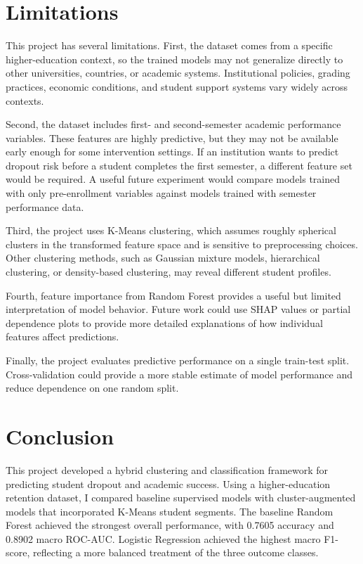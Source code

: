 \documentclass{article}
\begin{document}
\section{Limitations}

This project has several limitations. First, the dataset comes from a specific higher-education context, so the trained models may not generalize directly to other universities, countries, or academic systems. Institutional policies, grading practices, economic conditions, and student support systems vary widely across contexts.

Second, the dataset includes first- and second-semester academic performance variables. These features are highly predictive, but they may not be available early enough for some intervention settings. If an institution wants to predict dropout risk before a student completes the first semester, a different feature set would be required. A useful future experiment would compare models trained with only pre-enrollment variables against models trained with semester performance data.

Third, the project uses K-Means clustering, which assumes roughly spherical clusters in the transformed feature space and is sensitive to preprocessing choices. Other clustering methods, such as Gaussian mixture models, hierarchical clustering, or density-based clustering, may reveal different student profiles.

Fourth, feature importance from Random Forest provides a useful but limited interpretation of model behavior. Future work could use SHAP values or partial dependence plots to provide more detailed explanations of how individual features affect predictions.

Finally, the project evaluates predictive performance on a single train-test split. Cross-validation could provide a more stable estimate of model performance and reduce dependence on one random split.

\section{Conclusion}

This project developed a hybrid clustering and classification framework for predicting student dropout and academic success. Using a higher-education retention dataset, I compared baseline supervised models with cluster-augmented models that incorporated K-Means student segments. The baseline Random Forest achieved the strongest overall performance, with 0.7605 accuracy and 0.8902 macro ROC-AUC. Logistic Regression achieved the highest macro F1-score, reflecting a more balanced treatment of the three outcome classes.
\end{document}
